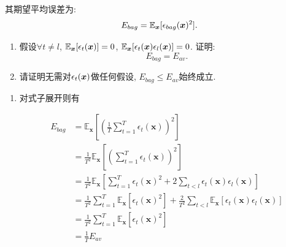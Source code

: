\documentclass[answers]{exam}  %
\begin{document}
\begin{questions}
  其期望平均误差为:
  \begin{equation}
    E_{bag}=\mathbb{E}_{{\boldsymbol{x}}}[\epsilon_{bag}({\boldsymbol{x}})^2].
  \end{equation}

  \begin{enumerate}
    \item 假设$\forall t\neq l$, $\mathbb{E}_{{\boldsymbol{x}}}[\epsilon_t({\boldsymbol{x}})]=0$, $ \mathbb{E}_{{\boldsymbol{x}}}[\epsilon_t({\boldsymbol{x}})\epsilon_l({\boldsymbol{x}})]=0$. 证明:
          \begin{equation}
            E_{bag}=E_{av}.
          \end{equation}

    \item 请证明无需对$\epsilon_t({\boldsymbol{x}})$做任何假设, $E_{bag}\leq E_{av}$始终成立.
  \end{enumerate}

  \begin{solution}
    \begin{enumerate}
      \item

            对式子展开则有

            $$
              \begin{aligned}
                E_{bag} & = \mathbb{E}_{\bm{x}}[(\frac{1}{T}\sum_{t=1}^{T}\epsilon_{t}(\bm{x}))^{2}]                                                                                              \\
                        & = \frac{1}{T^{2}}\mathbb{E}_{\bm{x}}[(\sum_{t=1}^{T}\epsilon_{t}(\bm{x}))^{2}]                                                                                          \\
                        & = \frac{1}{T^{2}}\mathbb{E}_{\bm{x}}[\sum_{t=1}^{T}\epsilon_{t}(\bm{x})^{2} + 2\sum_{t < l}\epsilon_{t}(\bm{x})\epsilon_{l}(\bm{x})]                                    \\
                        & = \frac{1}{T^{2}}\sum_{t=1}^{T}\mathbb{E}_{\bm{x}}[\epsilon_{t}(\bm{x})^{2}] + \frac{2}{T^{2}}\sum_{t < l}\mathbb{E}_{\bm{x}}[\epsilon_{t}(\bm{x})\epsilon_{l}(\bm{x})] \\
                        & = \frac{1}{T^{2}}\sum_{t=1}^{T}\mathbb{E}_{\bm{x}}[\epsilon_{t}(\bm{x})^{2}]                                                                                            \\
                        & = \frac{1}{T}E_{av}                                                                                                                                                     \\
              \end{aligned}
            $$


\end{enumerate}
\end{solution}
\end{questions}
\end{document}
